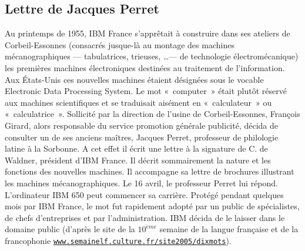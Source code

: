 \subsection{Lettre de Jacques Perret}\label{annexe:perret}
Au printemps de 1955, IBM France s'apprêtait à construire dans ses ateliers 
de Corbeil-Essonnes (consacrés jusque-là au montage des machines mécanographiques 
--- tabulatrices, trieuses, \ldots --- de technologie électromécanique) 
les premières machines électroniques destinées au traitement de l'information. 
Aux États-Unis ces nouvelles machines étaient désignées sous le vocable 
Electronic Data Processing System. Le mot «~computer~» était plutôt réservé 
aux machines scientifiques et se traduisait aisément en «~calculateur~» ou «~calculatrice~».
Sollicité par la direction de l'usine de Corbeil-Essonnes, François Girard, 
alors responsable du service promotion générale publicité, 
décida de consulter un de ses anciens maîtres, Jacques Perret, professeur de philologie 
latine à la Sorbonne. A cet effet il écrit une lettre à la signature de C. de Waldner, 
président d'IBM France. Il décrit sommairement la nature et les fonctions des 
nouvelles machines. Il accompagne sa lettre de brochures illustrant les machines 
mécanographiques. Le 16 avril, le professeur Perret lui répond.
L'ordinateur IBM 650 peut commencer sa carrière.
Protégé pendant quelques mois par IBM France, le mot fut rapidement adopté
par un public de spécialistes, de chefs d'entreprises et par l'administration. 
IBM décida de le laisser dans le domaine public
(d'après le site de la $10^{\grave eme}$ semaine de la langue française et de la francophonie
\href{http://www.semainelf.culture.fr/site2005/dixmots}{\tt www.semainelf.culture.fr/site2005/dixmots}).

